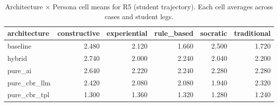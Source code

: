 \begin{table}[htbp]
\centering
\caption{Architecture $\times$ Persona cell means for R5 (student trajectory). Each cell averages across cases and student legs.}
\label{tab:cell-R5}
\begin{tabular}{lrrrrr}
\toprule
architecture & constructive & experiential & rule\_based & socratic & traditional \\
\midrule
baseline & 2.480 & 2.120 & 1.660 & 2.500 & 1.720 \\
hybrid & 2.740 & 2.000 & 2.240 & 2.040 & 2.200 \\
pure\_ai & 2.640 & 2.220 & 2.240 & 2.280 & 2.280 \\
pure\_cbr\_llm & 2.420 & 2.080 & 2.080 & 1.940 & 2.320 \\
pure\_cbr\_tpl & 1.300 & 1.360 & 1.320 & 1.280 & 1.240 \\
\bottomrule
\end{tabular}
\end{table}
